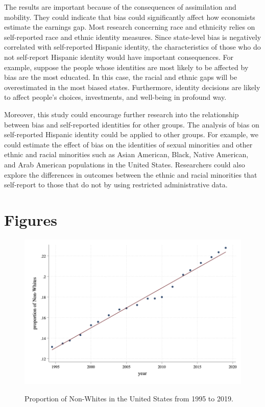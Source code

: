 \documentclass[12pt, fullpage]{article}
\begin{document}
The results are important because of the consequences of assimilation and mobility. They could indicate that bias could significantly affect how economists estimate the earnings gap. Most research concerning race and ethnicity relies on self-reported race and ethnic identity measures. Since state-level bias is negatively correlated with self-reported Hispanic identity, the characteristics of those who do not self-report Hispanic identity would have important consequences. For example, suppose the people whose identities are most likely to be affected by bias are the most educated. In this case, the racial and ethnic gaps will be overestimated in the most biased states. Furthermore, identity decisions are likely to affect people's choices, investments, and well-being in profound way. 

Moreover, this study could encourage further research into the relationship between bias and self-reported identities for other groups. The analysis of bias on self-reported Hispanic identity could be applied to other groups. For example, we could estimate the effect of bias on the identities of sexual minorities and other ethnic and racial minorities such as Asian American, Black, Native American, and Arab American populations in the United States. Researchers could also explore the differences in outcomes between the ethnic and racial minorities that self-report to those that do not by using restricted administrative data. 

\pagebreak
\newpage

\appendix

\pagebreak
\newpage

\section{Figures}

\begin{figure}[H]
\begin{center}
\caption{Proportion of Non-Whites in the United States from 1995 to 2019.}
\includegraphics[width=\textwidth]{GraphNonWhites.png} 
\label{fig:1}
\end{center}
\end{figure}
\end{document}
